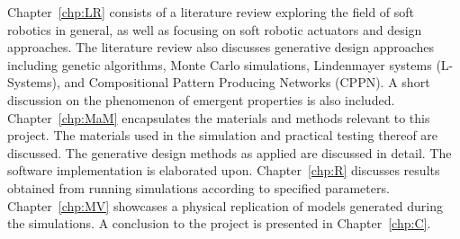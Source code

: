 Chapter~\ref{chp:LR} consists of a literature review exploring the field of soft robotics in general, as well as focusing on soft robotic actuators and design approaches. The literature review also discusses generative design approaches including genetic algorithms, Monte Carlo simulations, Lindenmayer systems (L-Systems), and Compositional Pattern Producing Networks (CPPN). A short discussion on the phenomenon of emergent properties is also included. Chapter~\ref{chp:MaM} encapsulates the materials and methods relevant to this project. The materials used in the simulation and practical testing thereof are discussed. The generative design methods as applied are discussed in detail. The software implementation is elaborated upon. Chapter~\ref{chp:R} discusses results obtained from running simulations according to specified parameters. Chapter~\ref{chp:MV} showcases a physical replication of models generated during the simulations. A conclusion to the project is presented in Chapter~\ref{chp:C}.